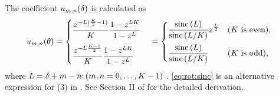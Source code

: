 \documentclass[sip,biber]{now-journal}
\begin{document}
The coefficient $u _{m,n}(\delta)$ is calculated as
\begin{align}
  u _{m,n}(\theta)
  &=
    \begin{cases}
      \displaystyle\frac{z ^{- L (\frac{K}{2} - 1) }}{K} \frac{1 - z ^{L K}}{1 - z ^{L}}\\[1em]
      \displaystyle\frac{z ^{- L \frac{K - 1}{2}}}{K} \frac{1 - z ^{L K}}{1 - z ^{L}}
    \end{cases}
  =
    \begin{cases}
      \displaystyle \frac{\operatorname{sinc}{(L)}}{\operatorname{sinc}{\left(L / K\right)}} z ^{\frac{L}{2}} & (\text{$K$ is even}),\\[1em]
      \displaystyle \frac{\operatorname{sinc}{(L)}}{\operatorname{sinc}{\left(L / K\right)}} & (\text{$K$ is odd}),
    \end{cases}\label{eq:rot:sinc}
\end{align}
where $L =\delta + m - n; (m, n = 0, \dots, K - 1)$ \cite{Wakabayashi:2023:ASLP}.
\eqref{eq:rot:sinc} is an alternative expression for (3) in \cite{Wakabayashi:2023:ASLP}.
See Section II of \cite{Wakabayashi:2023:ASLP} for the detailed derivation.
\end{document}
